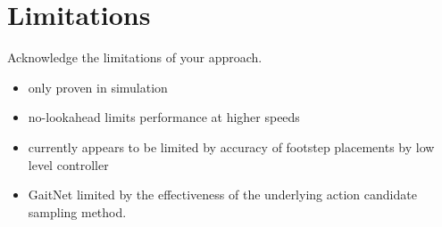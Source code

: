 \section{Limitations}

\begin{outline}
  Acknowledge the limitations of your approach.
\end{outline}

\begin{itemize}
  \item only proven in simulation
  \item no-lookahead limits performance at higher speeds
  \item currently appears to be limited by accuracy of footstep placements
    by low level controller
  \item GaitNet limited by the effectiveness of the underlying action
    candidate sampling method.
\end{itemize}
